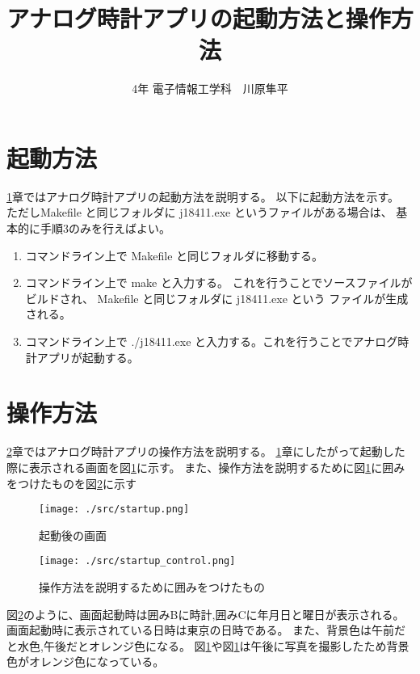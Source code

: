 \documentclass[a4paper,11pt]{jsarticle}
\begin{document}
\title{アナログ時計アプリの起動方法と操作方法}
\author{4年 電子情報工学科　川原隼平}
\date{}
\maketitle
  \section{起動方法}\label{sec:startup}
    \ref{sec:startup}章ではアナログ時計アプリの起動方法を説明する。
    以下に起動方法を示す。
    ただしMakefile と同じフォルダに j18411.exe というファイルがある場合は、
    基本的に手順3のみを行えばよい。

    \begin{enumerate}
      \item コマンドライン上で Makefile と同じフォルダに移動する。
      \item コマンドライン上で make と入力する。
      これを行うことでソースファイルがビルドされ、 Makefile と同じフォルダに j18411.exe という
      ファイルが生成される。
      \item コマンドライン上で ./j18411.exe と入力する。これを行うことでアナログ時計アプリが起動する。
    \end{enumerate}

  \section{操作方法}\label{sec:control}
    \ref{sec:control}章ではアナログ時計アプリの操作方法を説明する。
    \ref{sec:startup}章にしたがって起動した際に表示される画面を図\ref{fig:startup}に示す。
    また、操作方法を説明するために図\ref{fig:startup}に囲みをつけたものを図\ref{fig:startup-control}に示す

    \begin{figure}[H]
      \centering
      \texttt{[image: ./src/startup.png]}
      \caption{起動後の画面}
      \label{fig:startup}
    \end{figure}

    \begin{figure}[H]
      \centering
      \texttt{[image: ./src/startup\_control.png]}
      \caption{操作方法を説明するために囲みをつけたもの}
      \label{fig:startup-control}
    \end{figure}

    図\ref{fig:startup-control}のように、画面起動時は囲みBに時計,囲みCに年月日と曜日が表示される。
    画面起動時に表示されている日時は東京の日時である。
    また、背景色は午前だと水色,午後だとオレンジ色になる。
    図\ref{fig:startup}や図\ref{fig:startup}は午後に写真を撮影したため背景色がオレンジ色になっている。
\end{document}
